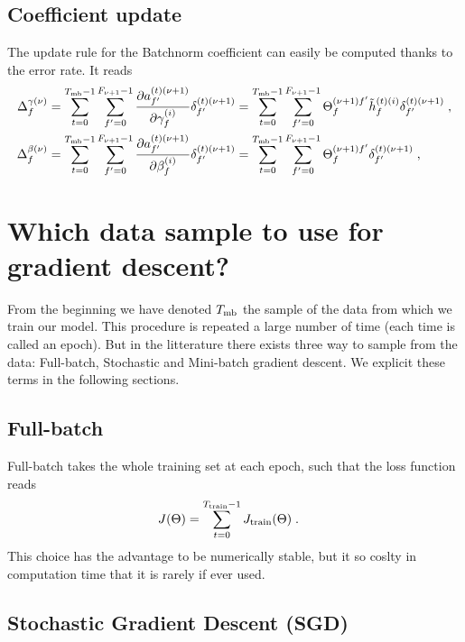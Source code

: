 \subsection{Coefficient update}

The update rule for the Batchnorm coefficient can easily be computed thanks to the error rate. It reads
\begin{align}
\Delta_f^{\gamma(\nu)}&=\sum_{t=0}^{T_{{\rm mb}}-1}\sum_{f'=0}^{F_{\nu+1}-1}
%
\frac{\partial a^{(t)(\nu+1)}_{f'}}{\partial\gamma_f^{(i)}}\delta^{(t)(\nu+1)}_{f'}
%
=\sum_{t=0}^{T_{{\rm mb}}-1}\sum_{f'=0}^{F_{\nu+1}-1}
%
\Theta^{(\nu+1)f'}_{f}\tilde{h}^{(t)(i)}_{f}\delta^{(t)(\nu+1)}_{f'}\;,\\
%
\Delta_f^{\beta(\nu)}&=\sum_{t=0}^{T_{{\rm mb}}-1}\sum_{f'=0}^{F_{\nu+1}-1}
%
\frac{\partial a^{(t)(\nu+1)}_{f'}}{\partial\beta_f^{(i)}}\delta^{(t)(\nu+1)}_{f'}
%
=\sum_{t=0}^{T_{{\rm mb}}-1}\sum_{f'=0}^{F_{\nu+1}-1}\Theta^{(\nu+1)f'}_{f}\delta^{(t)(\nu+1)}_{f'}\;,
\end{align}


\section{Which data sample to use for gradient descent?}

From the beginning we have denoted $T_{{\rm mb}}$ the sample of the data from which we train our model. This procedure is repeated a large number of time (each time is called an epoch). But in the litterature there exists three way to sample from the data: Full-batch, Stochastic and Mini-batch gradient descent. We explicit these terms in the following sections.

\subsection{Full-batch}

Full-batch takes the whole training set at each epoch, such that the loss function reads
\begin{align}
J(\Theta)&=\sum_{t=0}^{T_{{\rm train}}-1}J_{{\rm train}}(\Theta)\;.
\end{align}
This choice has the advantage to be numerically stable, but it so coslty in computation time that it is rarely if ever used.

\subsection{Stochastic Gradient Descent (SGD)}

